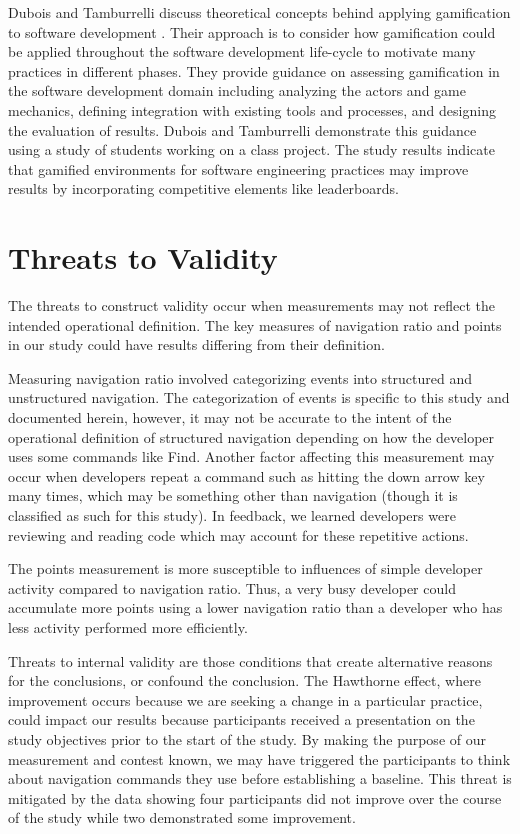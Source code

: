 \documentclass{sig-alternate}
\begin{document}
Dubois and Tamburrelli discuss theoretical concepts behind applying gamification to software development \cite{Dubois2013Understanding}. Their approach is to consider how gamification could be applied throughout the software development life-cycle to motivate many practices in different phases.  They provide guidance on assessing gamification in the software development domain including analyzing the actors and game mechanics, defining integration with existing tools and processes, and designing the evaluation of results.  Dubois and Tamburrelli demonstrate this guidance using a study of students working on a class project.  The study results indicate that gamified environments for software engineering practices may improve results by incorporating competitive elements like leaderboards.

\section{Threats to Validity}
The threats to construct validity occur when measurements may not reflect the intended operational definition. The key measures of navigation ratio and points in our study could have results differing from their definition.  

Measuring navigation ratio involved categorizing events into structured and unstructured navigation.  The categorization of events is specific to this study and documented herein, however, it may not be accurate to the intent of the operational definition of structured navigation depending on how the developer uses some commands like Find.  Another factor affecting this measurement may occur when developers repeat a command such as hitting the down arrow key many times, which may be something other than navigation (though it is classified as such for this study).  In feedback, we learned developers were reviewing and reading code which may account for these repetitive actions.

The points measurement is more susceptible to influences of simple developer activity compared to navigation ratio.  Thus, a very busy developer could accumulate more points using a lower navigation ratio than a developer who has less activity performed more efficiently.  

Threats to internal validity are those conditions that create alternative reasons for the conclusions, or confound the conclusion.  
The Hawthorne effect, where improvement occurs because we are seeking a change in a particular practice, could impact our results because participants received a presentation on the study objectives prior to the start of the study.  By making the purpose of our measurement and contest known,  we may have triggered the participants to think about navigation commands they use before establishing a baseline.   This threat is mitigated by the data showing four participants did not improve over the course of the study while two demonstrated some improvement.
\end{document}
